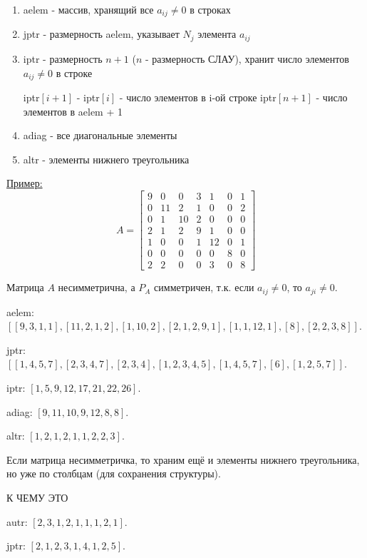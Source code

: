 \documentclass{bmstu}
\begin{document}
\begin{enumerate}
	\item aelem - массив, хранящий все $a_{ij}\neq 0$ в строках
	\item jptr - размерность aelem, указывает $N_j$ элемента $a_{ij}$
	\item iptr - размерность $n+1$ ($n$ - размерность СЛАУ), хранит число элементов $a_{ij}\neq 0$ в строке
	
	iptr$[i+1]$ - iptr$[i]$ - число элементов в i-ой строке
	iptr$[n+1]$ - число элементов в aelem + 1
	\item adiag - все диагональные элементы
	\item altr - элементы нижнего треугольника
\end{enumerate}

\underline{Пример:}
\[
A=
\begin{bmatrix}
	9&0&0&3&1&0&1 \\
	0&11&2&1&0&0&2 \\
	0&1&10&2&0&0&0 \\
	2&1&2&9&1&0&0 \\
	1&0&0&1&12&0&1 \\
	0&0&0&0&0&8&0 \\
	2&2&0&0&3&0&8 
\end{bmatrix}
\]

Матрица $A$ несимметрична, а $P_A$ симметричен, т.к. если $a_{ij}\neq 0$, то $a_{ji}\neq 0$.

aelem: $\left[\left[ 9, 3, 1, 1 \right], \left[11, 2, 1, 2\right], \left[1, 10, 2\right],\left[2, 1, 2 ,9, 1\right],\left[1, 1, 12, 1\right],\left[8\right],\left[2, 2, 3, 8\right] \right]$.

jptr: $\left[\left[1, 4, 5, 7\right], \left[2, 3, 4, 7\right], \left[2, 3, 4\right],\left[1, 2, 3, 4, 5\right],\left[1, 4, 5, 7 \right],\left[6\right],\left[1, 2, 5, 7\right] \right]$.

iptr: $\left[1, 5, 9, 12, 17, 21, 22, 26\right]$.

adiag: $\left[9, 11, 10, 9, 12, 8, 8\right]$.

altr: $\left[1,2, 1, 2, 1, 1, 2, 2, 3\right]$.

Если матрица несимметричка, то храним ещё и элементы нижнего треугольника, но уже по столбцам (для сохранения структуры).

К ЧЕМУ ЭТО

autr: $\left[2, 3, 1, 2, 1, 1, 1, 2, 1\right]$.

jptr: $\left[2, 1, 2, 3, 1, 4, 1, 2, 5\right]$.
\end{document}
